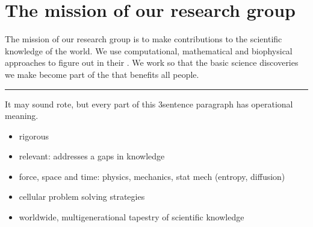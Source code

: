 \documentclass[letterpaper,10pt,english]{sphinxmanual}
\begin{document}
\section{The mission of our research group}
\label{\detokenize{01OurMission:the-mission-of-our-research-group}}
\sphinxAtStartPar
The mission of our research group is to make  contributions to the scientific knowledge of the world.
We use computational, mathematical and biophysical approaches to figure out  in their .
We work so that the basic science discoveries we make become part of the  that benefits all people.


\bigskip\hrule\bigskip


\sphinxAtStartPar
It may sound rote, but every part of this 3\sphinxhyphen{}sentence paragraph has operational meaning.
\begin{itemize}
\item {} 
\sphinxAtStartPar
rigorous

\item {} 
\sphinxAtStartPar
relevant: addresses a gaps in knowledge

\item {} 
\sphinxAtStartPar
force, space and time: physics, mechanics, stat mech (entropy, diffusion)

\item {} 
\sphinxAtStartPar
cellular problem solving strategies

\item {} 
\sphinxAtStartPar
worldwide, multi\sphinxhyphen{}generational tapestry of scientific knowledge

\end{itemize}
\end{document}
